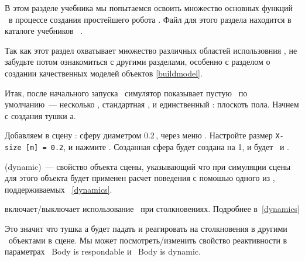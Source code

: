 \secrel{\bubblerob}\label{bublerob}


В этом разделе учебника мы попытаемся освоить множество основных функций
\vrep\ в процессе создания простейшего робота \bubblerob.
Файл  для этого раздела находится  в каталоге учебников 
\vrep\ . 

\clearpage
{}
\clearpage

Так как этот раздел охватывает множество различных областей использовния \vrep,
не забудьте потом ознакомиться с другими разделами, особенно с разделом
о создании качественных моделей объектов \ref{buildmodel}. 

Итак, после начального запуска \vrep\ симулятор показывает пустую
\ по умолчанию\ --- несколько , стандартная , и единственный
: плоскоть пола. Начнем с создания тушки
\bubblerob а.

Добавляем в сцену : сферу диаметром
0.2\,, через меню
.
Настройте размер \verb|X-size [m] = 0.2|, и нажмите .
Созданная сфера будет создана на  1, и будет
\ и . 

\begin{framed}\noindent
{} (dynamic)\ --- свойство объекта сцены,
указывающий что при симуляции сцены для этого объекта будет применен расчет
поведения с помошью одного из , поддерживаемых
\vrep\ \ref{dynamics}.

\noindent{} включает/выключает
использование \ при столкновениях. Подробнее
в\ \ref{dynamics}
\end{framed}

Это значит что тушка \bubblerob а будет падать и реагировать на столкновения
в другими \ объектами в сцене. Мы может посмотреть/изменить свойство реактивности
в параметрах \checkbox\ Body is respondable и
\checkbox\ Body is dynamic. 

